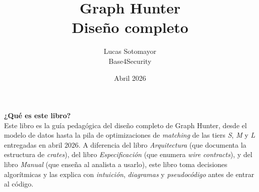 \documentclass[11pt,openany]{book}
\title{\Huge\bfseries Graph Hunter\\[0.4em]\color{accent}\Large Diseño completo}
\author{Lucas Sotomayor\\Base4Security}
\date{Abril 2026}
\begin{document}
\frontmatter
\maketitle

\begin{flushleft}
\textbf{¿Qué es este libro?}\\
Este libro es la guía pedagógica del diseño completo de Graph Hunter,
desde el modelo de datos hasta la pila de optimizaciones de \emph{matching}
de las tiers \emph{S}, \emph{M} y \emph{L} entregadas en abril 2026.
A diferencia del libro \emph{Arquitectura} (que documenta la estructura
de \emph{crates}), del libro \emph{Especificación} (que enumera \emph{wire
contracts}), y del libro \emph{Manual} (que enseña al analista a usarlo),
este libro toma decisiones algorítmicas y las explica con \emph{intuición},
\emph{diagramas} y \emph{pseudocódigo} antes de entrar al código.
\end{flushleft}

\tableofcontents

\mainmatter










\end{document}
